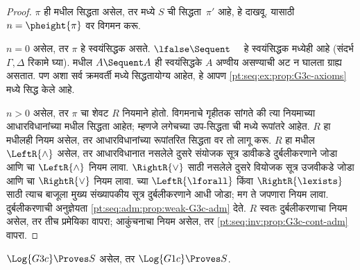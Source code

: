 \begin{proof}
  $\pi$ ही  मधील सिद्धता असेल, तर  मध्ये
  $S$ ची सिद्धता~$\pi'$ आहे, हे दाखवू. यासाठी $n
  = \pheight{\pi}$ वर विगमन करू.

  $n = 0$ असेल, तर $\pi$ हे स्वयंसिद्धक असते. $\lfalse \Sequent
  \quad$ हे स्वयंसिद्धक  मध्येही आहे (संदर्भ $\Gamma,
  \Delta$ रिकामे घ्या).  मधील $A \Sequent A$ ही
  स्वयंसिद्धके $A$ अण्वीय असण्याची अट न घालता ग्राह्य असतात.
  पण अशा सर्व क्रमवर्ती  मध्ये सिद्धतायोग्य आहेत, हे आपण
  \ref{pt:seq:ex:prop:G3c-axioms} मध्ये सिद्ध केले आहे.

  $n>0$ असेल, तर $\pi$ चा शेवट $R$ नियमाने होतो. विगमनाचे
  गृहीतक सांगते की त्या नियमाच्या आधारविधानांच्या 
  मधील सिद्धता आहेत; म्हणजे लगेचच्या उप-सिद्धता ची
   मध्ये रूपांतरे आहेत. $R$ हा  मधीलही नियम
  असेल, तर आधारविधानांच्या रूपांतरित सिद्धता वर तो लागू करू.
  $R$ हा  मधील $\LeftR{\land}$ असेल,
  तर आधारविधानात नसलेले दुसरे संयोजक सूत्र डावीकडे
  दुर्बलीकरणाने जोडा आणि  चा $\LeftR{\land}$
  नियम लावा. $\RightR{\lor}$ साठी नसलेले दुसरे वियोजक
  सूत्र उजवीकडे जोडा आणि  चा $\RightR{\lor}$
  नियम लावा.  च्या $\LeftR{\lforall}$ किंवा
  $\RightR{\lexists}$ साठी त्याच बाजूला मुख्य संख्यापकीय
  सूत्र दुर्बलीकरणाने आधी जोडा; मग ते जपणारा 
  नियम लावा. दुर्बलीकरणाची अनुज्ञेयता
  \ref{pt:seq:adm:prop:weak-G3c-adm} देते. $R$ स्वतः
  दुर्बलीकरणाचा नियम असेल, तर तीच प्रमेयिका वापरा;
  आकुंचनाचा नियम असेल, तर
  \ref{pt:seq:inv:prop:G3c-cont-adm} वापरा.
\end{proof}

\begin{prop}
$\Log{G3c} \Proves S$ असेल, तर $\Log{G1c} \Proves S$.
\end{prop}

